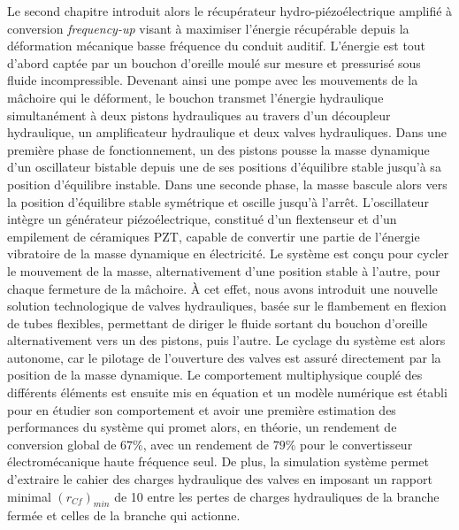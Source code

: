 Le second chapitre introduit alors le récupérateur hydro-piézoélectrique amplifié à conversion \emph{frequency-up} visant à maximiser l'énergie récupérable depuis la déformation mécanique basse fréquence du conduit auditif. L'énergie est tout d'abord captée par un bouchon d'oreille moulé sur mesure et pressurisé sous fluide incompressible. Devenant ainsi une pompe avec les mouvements de la mâchoire qui le déforment, le bouchon transmet l'énergie hydraulique simultanément à deux pistons hydrauliques au travers d'un découpleur hydraulique, un amplificateur hydraulique et deux valves hydrauliques. Dans une première phase de fonctionnement, un des pistons pousse la masse dynamique d'un oscillateur bistable depuis une de ses positions d'équilibre stable jusqu'à sa position d'équilibre instable. Dans une seconde phase, la masse bascule alors vers la position d'équilibre stable symétrique et oscille jusqu'à l'arrêt. L'oscillateur intègre un générateur piézoélectrique, constitué d'un flextenseur et d'un empilement de céramiques PZT, capable de convertir une partie de l'énergie vibratoire de la masse dynamique en électricité. Le système est conçu pour cycler le mouvement de la masse, alternativement d'une position stable à l'autre, pour chaque fermeture de la mâchoire. À cet effet, nous avons introduit une nouvelle solution technologique de valves hydrauliques, basée sur le flambement en flexion de tubes flexibles, permettant de diriger le fluide sortant du bouchon d'oreille alternativement vers un des pistons, puis l'autre. Le cyclage du système est alors autonome, car le pilotage de l'ouverture des valves est assuré directement par la position de la masse dynamique. Le comportement multiphysique couplé des différents éléments est ensuite mis en équation et un modèle numérique est établi pour en étudier son comportement et avoir une première estimation des performances du système qui promet alors, en théorie, un rendement de conversion global de $67$\%, avec un rendement de $79$\% pour le convertisseur électromécanique haute fréquence seul. De plus, la simulation système permet d'extraire le cahier des charges hydraulique des valves en imposant un rapport minimal $(r_{Cf})_{min}$ de 10 entre les pertes de charges hydrauliques de la branche fermée et celles de la branche qui actionne.

